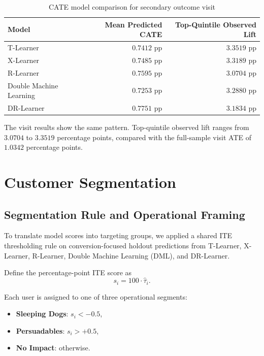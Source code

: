 \documentclass[journal,11pt,onecolumn]{IEEEtran}
\begin{document}
\begin{table}[!htbp]
    \centering
    \caption{CATE model comparison for secondary outcome visit}
    \label{tab:cate_visit}
    \small
    \begin{tabular}{lrr}
        \toprule
        Model                   & Mean Predicted CATE & Top-Quintile Observed Lift \\
        \midrule
        T-Learner               & \(0.7412\) pp       & \(3.3519\) pp              \\
        X-Learner               & \(0.7485\) pp       & \(3.3189\) pp              \\
        R-Learner               & \(0.7595\) pp       & \(3.0704\) pp              \\
        Double Machine Learning & \(0.7253\) pp       & \(3.2880\) pp              \\
        DR-Learner              & \(0.7751\) pp       & \(3.1834\) pp              \\
        \bottomrule
    \end{tabular}
\end{table}

The visit results show the same pattern. Top-quintile observed lift ranges from \(3.0704\) to \(3.3519\) percentage points, compared with the full-sample visit ATE of \(1.0342\) percentage points.

\section{Customer Segmentation}

\subsection{Segmentation Rule and Operational Framing}

To translate model scores into targeting groups, we applied a shared ITE thresholding rule on conversion-focused holdout predictions from T-Learner, X-Learner, R-Learner, Double Machine Learning (DML), and DR-Learner.

Define the percentage-point ITE score as
\begin{equation}
    s_i = 100 \cdot \hat{\tau}_i .
\end{equation}

Each user is assigned to one of three operational segments:
\begin{itemize}
    \item \textbf{Sleeping Dogs}: \(s_i < -0.5\),
    \item \textbf{Persuadables}: \(s_i > +0.5\),
    \item \textbf{No Impact}: otherwise.
\end{itemize}
\end{document}
